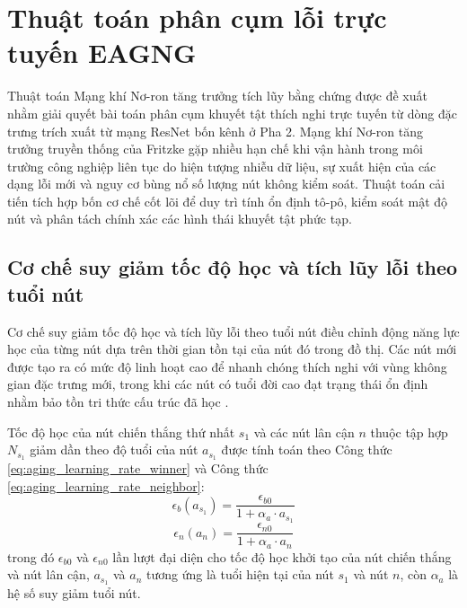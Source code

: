 \section{Thuật toán phân cụm lỗi trực tuyến EAGNG}
\label{sec:thuat_toan_eagng}

Thuật toán Mạng khí Nơ-ron tăng trưởng tích lũy bằng chứng được đề xuất nhằm giải quyết bài toán phân cụm khuyết tật thích nghi trực tuyến từ dòng đặc trưng trích xuất từ mạng ResNet bốn kênh ở Pha 2. Mạng khí Nơ-ron tăng trưởng truyền thống của Fritzke \cite{fritzke1995growing} gặp nhiều hạn chế khi vận hành trong môi trường công nghiệp liên tục do hiện tượng nhiễu dữ liệu, sự xuất hiện của các dạng lỗi mới và nguy cơ bùng nổ số lượng nút không kiểm soát. Thuật toán cải tiến tích hợp bốn cơ chế cốt lõi để duy trì tính ổn định tô-pô, kiểm soát mật độ nút và phân tách chính xác các hình thái khuyết tật phức tạp.

\subsection{Cơ chế suy giảm tốc độ học và tích lũy lỗi theo tuổi nút}
\label{subsec:node_aging_dynamic}

Cơ chế suy giảm tốc độ học và tích lũy lỗi theo tuổi nút điều chỉnh động năng lực học của từng nút dựa trên thời gian tồn tại của nút đó trong đồ thị. Các nút mới được tạo ra có mức độ linh hoạt cao để nhanh chóng thích nghi với vùng không gian đặc trưng mới, trong khi các nút có tuổi đời cao đạt trạng thái ổn định nhằm bảo tồn tri thức cấu trúc đã học \cite{martinetz1993neural}.

Tốc độ học của nút chiến thắng thứ nhất $s_1$ và các nút lân cận $n$ thuộc tập hợp $N_{s_1}$ giảm dần theo độ tuổi của nút $a_{s_1}$ được tính toán theo Công thức \ref{eq:aging_learning_rate_winner} và Công thức \ref{eq:aging_learning_rate_neighbor}:
\begin{equation}
\label{eq:aging_learning_rate_winner}
\epsilon_b(a_{s_1}) = \frac{\epsilon_{b0}}{1 + \alpha_a \cdot a_{s_1}}
\end{equation}
\begin{equation}
\label{eq:aging_learning_rate_neighbor}
\epsilon_n(a_n) = \frac{\epsilon_{n0}}{1 + \alpha_a \cdot a_n}
\end{equation}
trong đó $\epsilon_{b0}$ và $\epsilon_{n0}$ lần lượt đại diện cho tốc độ học khởi tạo của nút chiến thắng và nút lân cận, $a_{s_1}$ và $a_n$ tương ứng là tuổi hiện tại của nút $s_1$ và nút $n$, còn $\alpha_a$ là hệ số suy giảm tuổi nút.

